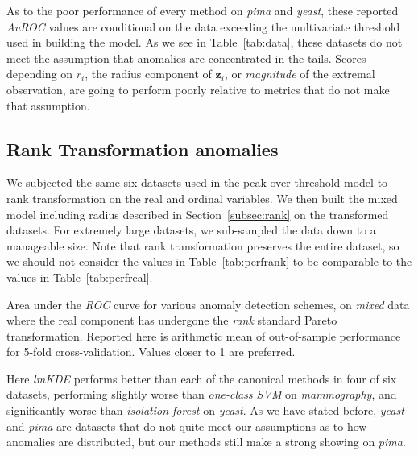 As to the poor performance of every method on \emph{pima} and \emph{yeast}, these reported
    \emph{AuROC} values are conditional on the data exceeding the multivariate threshold used
    in building the model.  As we see in Table~\ref{tab:data}, these datasets do not meet the
    assumption that anomalies are concentrated in the tails.  Scores depending on $r_i$, the
    radius component of $\bm{z}_i$, or \emph{magnitude} of the extremal observation, are 
    going to perform poorly relative to metrics that do not make that assumption.

\subsection{Rank Transformation anomalies}
We subjected the same six datasets used in the peak-over-threshold model to rank transformation 
    on the real and ordinal variables. We then built the mixed model including radius described
    in Section~\ref{subsec:rank} on the transformed datasets.  For extremely large datasets, we
    sub-sampled the data down to a manageable size.
    Note that rank transformation preserves the entire dataset, so we should not consider 
    the values in Table~\ref{tab:perfrank} to be comparable to the values in Table~\ref{tab:perfreal}.
    
\begin{table}[ht]
    \centering
    \caption{Area under the \emph{ROC} curve for various anomaly detection schemes,
        on \emph{mixed} data where the real component has undergone the \emph{rank}
        standard Pareto transformation. Reported here is arithmetic mean of 
        out-of-sample performance for 5-fold cross-validation.  Values closer to 1 are preferred.\label{tab:perfrank}}
    \bigskip
    
\end{table}

Here \emph{lmKDE} performs better than each of the canonical methods in four of six
    datasets, performing slightly worse than \emph{one-class SVM} on \emph{mammography},
    and significantly worse than \emph{isolation forest} on \emph{yeast}.  As we have stated 
    before, \emph{yeast} and \emph{pima} are datasets that do not quite meet our assumptions as
    to how anomalies are distributed, but our methods still make a strong showing on \emph{pima}.
    

